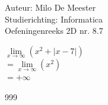 \documentclass[a4paper]{article}
\begin{document}
  
\noindent \large Auteur: Milo De Meester \\
\noindent \large Studierichting: Informatica\\
\noindent \large Oefeningenreeks 2D nr. 8.7\\

\medskip

\normalsize

$\lim\limits_{x\rightarrow\infty}(x^2 + |x-7|)$\\

$=\lim\limits_{x\rightarrow\infty}(x^2)$\\

$=+\infty$\\

\begin{thebibliography}{999}
\end{thebibliography}
\end{document}

